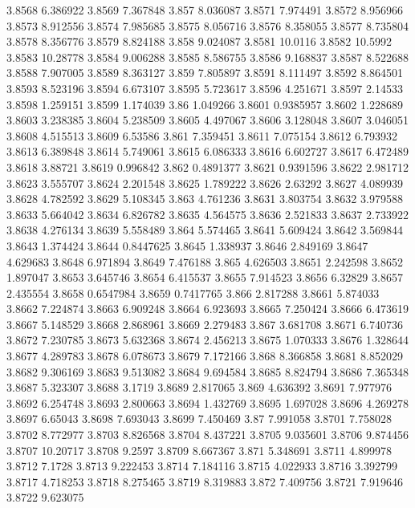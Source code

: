 3.8568  6.386922
3.8569  7.367848
3.857  8.036087
3.8571  7.974491
3.8572  8.956966
3.8573  8.912556
3.8574  7.985685
3.8575  8.056716
3.8576  8.358055
3.8577  8.735804
3.8578  8.356776
3.8579  8.824188
3.858  9.024087
3.8581  10.0116
3.8582  10.5992
3.8583  10.28778
3.8584  9.006288
3.8585  8.586755
3.8586  9.168837
3.8587  8.522688
3.8588  7.907005
3.8589  8.363127
3.859  7.805897
3.8591  8.111497
3.8592  8.864501
3.8593  8.523196
3.8594  6.673107
3.8595  5.723617
3.8596  4.251671
3.8597  2.14533
3.8598  1.259151
3.8599  1.174039
3.86  1.049266
3.8601  0.9385957
3.8602  1.228689
3.8603  3.238385
3.8604  5.238509
3.8605  4.497067
3.8606  3.128048
3.8607  3.046051
3.8608  4.515513
3.8609  6.53586
3.861  7.359451
3.8611  7.075154
3.8612  6.793932
3.8613  6.389848
3.8614  5.749061
3.8615  6.086333
3.8616  6.602727
3.8617  6.472489
3.8618  3.88721
3.8619  0.996842
3.862  0.4891377
3.8621  0.9391596
3.8622  2.981712
3.8623  3.555707
3.8624  2.201548
3.8625  1.789222
3.8626  2.63292
3.8627  4.089939
3.8628  4.782592
3.8629  5.108345
3.863  4.761236
3.8631  3.803754
3.8632  3.979588
3.8633  5.664042
3.8634  6.826782
3.8635  4.564575
3.8636  2.521833
3.8637  2.733922
3.8638  4.276134
3.8639  5.558489
3.864  5.574465
3.8641  5.609424
3.8642  3.569844
3.8643  1.374424
3.8644  0.8447625
3.8645  1.338937
3.8646  2.849169
3.8647  4.629683
3.8648  6.971894
3.8649  7.476188
3.865  4.626503
3.8651  2.242598
3.8652  1.897047
3.8653  3.645746
3.8654  6.415537
3.8655  7.914523
3.8656  6.32829
3.8657  2.435554
3.8658  0.6547984
3.8659  0.7417765
3.866  2.817288
3.8661  5.874033
3.8662  7.224874
3.8663  6.909248
3.8664  6.923693
3.8665  7.250424
3.8666  6.473619
3.8667  5.148529
3.8668  2.868961
3.8669  2.279483
3.867  3.681708
3.8671  6.740736
3.8672  7.230785
3.8673  5.632368
3.8674  2.456213
3.8675  1.070333
3.8676  1.328644
3.8677  4.289783
3.8678  6.078673
3.8679  7.172166
3.868  8.366858
3.8681  8.852029
3.8682  9.306169
3.8683  9.513082
3.8684  9.694584
3.8685  8.824794
3.8686  7.365348
3.8687  5.323307
3.8688  3.1719
3.8689  2.817065
3.869  4.636392
3.8691  7.977976
3.8692  6.254748
3.8693  2.800663
3.8694  1.432769
3.8695  1.697028
3.8696  4.269278
3.8697  6.65043
3.8698  7.693043
3.8699  7.450469
3.87  7.991058
3.8701  7.758028
3.8702  8.772977
3.8703  8.826568
3.8704  8.437221
3.8705  9.035601
3.8706  9.874456
3.8707  10.20717
3.8708  9.2597
3.8709  8.667367
3.871  5.348691
3.8711  4.899978
3.8712  7.1728
3.8713  9.222453
3.8714  7.184116
3.8715  4.022933
3.8716  3.392799
3.8717  4.718253
3.8718  8.275465
3.8719  8.319883
3.872  7.409756
3.8721  7.919646
3.8722  9.623075
